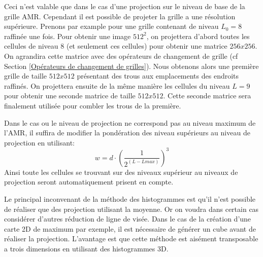 


Ceci n'est valable que dans le cas d'une projection sur le niveau de base de la grille \ac{AMR}.
Cependant il est possible de projeter la grille a une résolution supérieure.
Prenons par example pour une grille contenant de niveau $L_{0}=8$ raffinée une fois.
Pour obtenir une image $512^2$, on projettera d'abord toutes les cellules de niveau 8 (et seulement ces cellules) pour obtenir une matrice $256x256$.
On agrandira cette matrice avec des opérateurs de changement de grille (cf Section \ref{Opérateurs de changement de grilles}).
Nous obtenons alors une première grille de taille $512x512$ présentant des trous aux emplacements des endroits raffinés.
On projettera ensuite de la même manière les cellules du niveau $L=9$ pour obtenir une seconde matrice de taille $512x512$.
Cette seconde matrice sera finalement utilisée pour combler les trous de la première.

Dans le cas ou le niveau de projection ne correspond pas au niveau maximum de l'AMR, il suffira de modifier la pondération des niveau supérieurs au niveau de projection en utilisant:
\begin{equation}
w = d \cdot \left( \frac{1}{2^{(L-Lmax)} }\right)^3
\end{equation}
Ainsi toute les cellules se trouvant sur des niveaux supérieur au niveaux de projection seront automatiquement prisent en compte.

Le principal inconvenant de la méthode des histogrammes est qu'il n'est possible de réaliser que des projection utilisant la moyenne.
Or on voudra dans certain cas considérer d'autres réduction de ligne de visée.
Dans le cas de la création d'une carte 2D de maximum par exemple, il est nécessaire de générer un cube avant de réaliser la projection.
L'avantage est que cette méthode est aisément transposable a trois dimensions en utilisant des histogrammes 3D.


